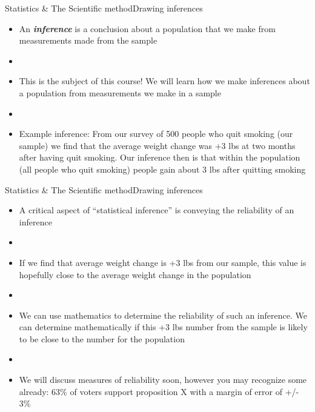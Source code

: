 \documentclass[xcolor=dvipsnames]{beamer}
\begin{document}
\begin{frame}{Statistics \& The Scientific method}{Drawing inferences}
	\begin{itemize}
		\item An \textbf{\emph{inference}} is a conclusion about a population that we make from measurements made from the sample
		\item[]
		\item This is the subject of this course! We will learn how we make inferences about a population from measurements we make in a sample
		\item[]
		\item Example inference: From our survey of 500 people who quit smoking (our sample) we find that the average weight change was +3 lbs at two months after having quit smoking. Our inference then is that within the population (all people who quit smoking) people gain about 3 lbs after quitting smoking
	\end{itemize}
\end{frame}

\begin{frame}{Statistics \& The Scientific method}{Drawing inferences}
	\begin{itemize}
		\item A critical aspect of “statistical inference” is conveying the reliability of an inference
		\item[]
		\item If we find that average weight change is +3 lbs from our sample, this value is hopefully close to the average weight change in the population
		\item[]
		\item 	We can use mathematics to determine the reliability of such an inference. We can determine mathematically if this +3 lbs number from the sample is likely to be close to the number for the population
		\item[]
		\item We will discuss measures of reliability soon, however you may recognize some already: 63\% of voters support proposition X with a margin of error of +/- 3\%
	\end{itemize}
\end{frame}
\end{document}
